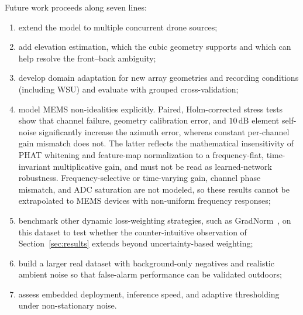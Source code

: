 \documentclass[sensors,article,submit,pdftex,moreauthors]{Definitions/mdpi}
\begin{document}
Future work proceeds along seven lines:
\begin{enumerate}
    \item extend the model to multiple concurrent drone sources;
    \item add elevation estimation, which the cubic geometry supports and which can help resolve the front--back ambiguity;
    \item develop domain adaptation for new array geometries and recording conditions (including WSU) and evaluate with grouped cross-validation;
    \item model MEMS non-idealities explicitly. Paired, Holm-corrected stress tests show that channel failure, geometry calibration error, and $10\,\mathrm{dB}$ element self-noise significantly increase the azimuth error, whereas constant per-channel gain mismatch does not. The latter reflects the mathematical insensitivity of PHAT whitening and feature-map normalization to a frequency-flat, time-invariant multiplicative gain, and must not be read as learned-network robustness. Frequency-selective or time-varying gain, channel phase mismatch, and ADC saturation are not modeled, so these results cannot be extrapolated to MEMS devices with non-uniform frequency responses;
    \item benchmark other dynamic loss-weighting strategies, such as GradNorm~\cite{chen2018gradnorm}, on this dataset to test whether the counter-intuitive observation of Section~\ref{sec:results} extends beyond uncertainty-based weighting;
    \item build a larger real dataset with background-only negatives and realistic ambient noise so that false-alarm performance can be validated outdoors;
    \item assess embedded deployment, inference speed, and adaptive thresholding under non-stationary noise.
\end{enumerate}



\end{document}
